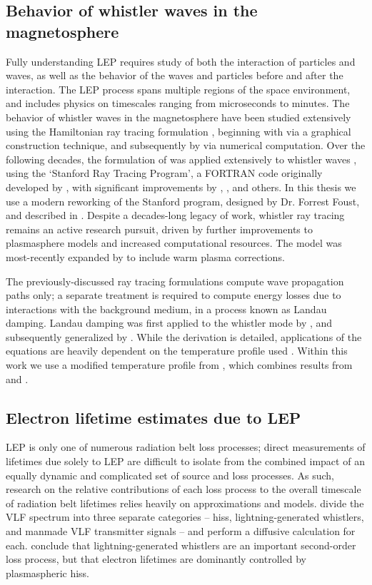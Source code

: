 \subsection{Behavior of whistler waves in the magnetosphere}
Fully understanding LEP requires study of both the interaction of particles and waves, as well as the behavior of the waves and particles before and after the interaction. The LEP process spans multiple regions of the space environment, and includes physics on timescales ranging from microseconds to minutes. The behavior of whistler waves in the magnetosphere have been studied extensively using the Hamiltonian ray tracing formulation \citep{Stix1992, Landau1975}, beginning with \cite{Haselgrove1955} via a graphical construction technique, and subsequently by \cite{Haselgrove1960} via numerical computation. Over the following decades, the formulation of \citeauthor{Haselgrove1955} was applied extensively to whistler waves \citep{Kimura1966, Edgar1972}, using the `Stanford Ray Tracing Program', a FORTRAN code originally developed by \cite{Walter1969}, with significant improvements by \cite{Inan1977b}, \cite{Ngo1989}, and others. In this thesis we use a modern reworking of the Stanford program, designed by Dr. Forrest Foust, and described in \cite{Golden2010}. Despite a decades-long legacy of work, whistler ray tracing remains an active research pursuit, driven by further improvements to plasmasphere models and increased computational resources. The \citeauthor{Golden2010} model was most-recently expanded by \cite{Maxworth2017} to include warm plasma corrections.

The previously-discussed ray tracing formulations compute wave propagation paths only; a separate treatment is required to compute energy losses due to interactions with the background medium, in a process known as Landau damping. Landau damping was first applied to the whistler mode by \cite{Kennel1966}, and subsequently generalized by \cite{Brinca1972}. While the derivation is detailed, applications of the \citeauthor{Brinca1972} equations are heavily dependent on the temperature profile used \citep{Thorne1994, Bell2002}. Within this work we use a modified temperature profile from \cite{Golden2010}, which combines results from \cite{Bell2002} and \cite{Bortnik2007}.

\subsection{Electron lifetime estimates due to LEP}
LEP is only one of numerous radiation belt loss processes; direct measurements of lifetimes due solely to LEP are difficult to isolate from the combined impact of an equally dynamic and complicated set of source and loss processes. As such, research on the relative contributions of each loss process to the overall timescale of radiation belt lifetimes relies heavily on approximations and models. \cite{Abel1998} divide the VLF spectrum into three separate categories -- hiss, lightning-generated whistlers, and manmade VLF transmitter signals -- and perform a diffusive calculation for each. \citeauthor{Abel1998} conclude that lightning-generated whistlers are an important second-order loss process, but that electron lifetimes are dominantly controlled by plasmaspheric hiss.

